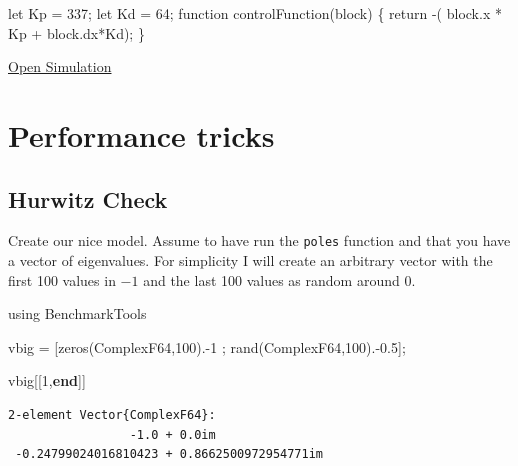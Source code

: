 \documentclass[
  8pt,
  a4paper,
]{book}
\newenvironment{Shaded}{\begin{snugshade}}{\end{snugshade}}
\newcommand{\BuiltInTok}[1]{\textcolor[rgb]{0.00,0.23,0.31}{#1}}
\newcommand{\DataTypeTok}[1]{\textcolor[rgb]{0.68,0.00,0.00}{#1}}
\newcommand{\FloatTok}[1]{\textcolor[rgb]{0.68,0.00,0.00}{#1}}
\newcommand{\FunctionTok}[1]{\textcolor[rgb]{0.28,0.35,0.67}{#1}}
\newcommand{\ImportTok}[1]{\textcolor[rgb]{0.00,0.46,0.62}{#1}}
\newcommand{\KeywordTok}[1]{\textcolor[rgb]{0.00,0.23,0.31}{\textbf{#1}}}
\newcommand{\NormalTok}[1]{\textcolor[rgb]{0.00,0.23,0.31}{#1}}
\newcommand{\OperatorTok}[1]{\textcolor[rgb]{0.37,0.37,0.37}{#1}}
\begin{document}
\begin{Shaded}
\begin{Highlighting}[]
\NormalTok{let Kp = 337;}
\NormalTok{let Kd = 64;}
\NormalTok{function controlFunction(block)}
\NormalTok{\{}
\NormalTok{  return {-}( block.x * Kp + block.dx*Kd);}
\NormalTok{\}}
\end{Highlighting}
\end{Shaded}

\href{https://pages.icpmol.es/ControlChallenges/index.html?target=TutorialBlockWithFriction&code=bGV0IEtwID0gMzM3OwpsZXQgS2QgPSA2NDsKZnVuY3Rpb24gY29udHJvbEZ1bmN0aW9uKGJsb2NrKQp7CiAgcmV0dXJuIC0oIGJsb2NrLnggKiBLcCArIGJsb2NrLmR4KktkKTsKfQ==}{Open
Simulation}

\cleardoublepage
{}
{}
\appendix

\chapter{Performance tricks}\label{performance-tricks}

\section{Hurwitz Check}\label{hurwitz-check}

Create our nice model. Assume to have run the \texttt{poles} function
and that you have a vector of eigenvalues. For simplicity I will create
an arbitrary vector with the first 100 values in \(-1\) and the last 100
values as random around \(0\).

\begin{Shaded}
\begin{Highlighting}[]
\ImportTok{using} \BuiltInTok{BenchmarkTools}

\NormalTok{vbig }\OperatorTok{=}\NormalTok{ [}\FunctionTok{zeros}\NormalTok{(}\DataTypeTok{ComplexF64}\NormalTok{,}\FloatTok{100}\NormalTok{)}\OperatorTok{.{-}}\FloatTok{1}\NormalTok{ ; }\FunctionTok{rand}\NormalTok{(}\DataTypeTok{ComplexF64}\NormalTok{,}\FloatTok{100}\NormalTok{)}\OperatorTok{.{-}}\FloatTok{0.5}\NormalTok{];}

\NormalTok{vbig[[}\FloatTok{1}\NormalTok{,}\KeywordTok{end}\NormalTok{]]}
\end{Highlighting}
\end{Shaded}

\begin{verbatim}
2-element Vector{ComplexF64}:
                 -1.0 + 0.0im
 -0.24799024016810423 + 0.8662500972954771im
\end{verbatim}
\end{document}
